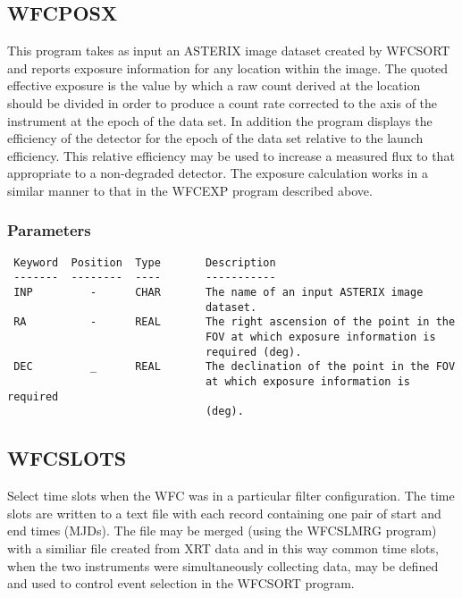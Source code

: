 \documentclass{book}
\renewcommand{\_}{{\tt\char'137}}     %
\begin{document}
\subsection{WFCPOSX}
This program takes as input an ASTERIX image dataset created by WFCSORT
and reports exposure information for any location within the image.
The quoted effective exposure is the value by which a raw count derived
at the location should be divided in order to produce a count rate
corrected to the axis of the instrument at the epoch of the data set.
In addition the program displays the efficiency of the detector for the
epoch of the data set relative to the launch efficiency. This relative
efficiency may be used to increase a measured flux to that appropriate
to a non-degraded detector. The exposure calculation works in a similar
manner to that in the WFCEXP program described above.

\subsubsection{Parameters}
\begin{verbatim}
 Keyword  Position  Type       Description
 -------  --------  ----       -----------
 INP         -      CHAR       The name of an input ASTERIX image
                               dataset.
 RA          -      REAL       The right ascension of the point in the
                               FOV at which exposure information is
                               required (deg).
 DEC         _      REAL       The declination of the point in the FOV
                               at which exposure information is required
                               (deg).

\end{verbatim}\subsection{WFCSLOTS}
Select time slots when the WFC was in a particular filter configuration.
The time slots are written to a text file with each record containing
one pair of start and end times (MJDs). The file may be merged (using
the WFCSLMRG program) with a similiar file created from XRT data and in
this way common time slots, when the two instruments were simultaneously
collecting data, may be defined and used to control event selection in
the WFCSORT program.
\end{document}
